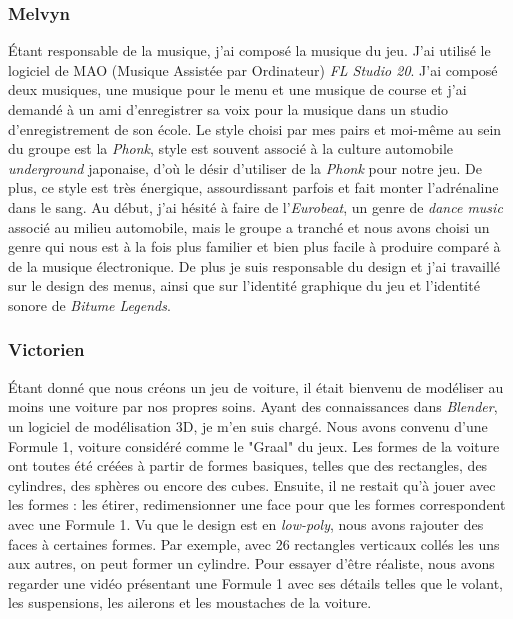 \documentclass[12pt,a4paper]{article}
\newcommand{\btmlgs}{\textsl{Bitume Legends}}
\begin{document}
\clearpage

    \subsubsection{Melvyn}
        Étant responsable de la musique, j'ai composé la 
        musique du jeu. J'ai utilisé le logiciel de MAO (Musique Assistée par Ordinateur) 
        \textsl{FL Studio 20}. J'ai composé deux musiques, une musique pour le menu et 
        une musique de course et j'ai demandé à un ami d'enregistrer sa voix pour la musique
        dans un studio d'enregistrement de son école. Le style choisi par mes pairs et moi-même
        au sein du groupe est la \textsl{Phonk}, style est souvent associé à la culture automobile
        \textit{underground} japonaise, d'où le désir d'utiliser de la \textsl{Phonk} pour notre jeu. 
        De plus, ce style est très énergique, assourdissant parfois et fait monter l'adrénaline
        dans le sang. Au début, j'ai hésité à faire de l'\textit{Eurobeat}, un genre de \textit{dance music}
        associé au milieu automobile, mais le groupe a tranché et nous avons choisi un genre qui
        nous est à la fois plus familier et bien plus facile à produire comparé à de la musique
        électronique. De plus je suis responsable du design et j'ai travaillé sur le design des
        menus, ainsi que sur l'identité graphique du jeu et l'identité sonore de \btmlgs.

    \subsubsection{Victorien}
        Étant donné que nous créons un jeu de voiture, il était 
        bienvenu de modéliser au moins une voiture par nos propres soins. 
        Ayant des connaissances dans \textsl{Blender}, un logiciel 
        de modélisation 3D, je m'en suis chargé. 
        Nous avons convenu d'une Formule 1, voiture considéré comme le "Graal" du jeux. 
        Les formes de la voiture ont toutes été créées à partir de formes basiques,
        telles que des rectangles, des cylindres, des sphères ou encore des cubes. 
        Ensuite, il ne restait qu'à jouer avec les formes : les étirer, 
        redimensionner une face pour que les formes correspondent avec une Formule 1. 
        Vu que le design est en \textit{low-poly}, nous avons rajouter des
        faces à certaines formes. Par exemple, avec 26 rectangles verticaux collés les 
        uns aux autres, on peut former un cylindre.
        Pour essayer d'être réaliste, nous avons regarder une 
        vidéo présentant une Formule 1 avec ses détails telles que le volant, 
        les suspensions, les ailerons et les moustaches de la voiture.
\end{document}
